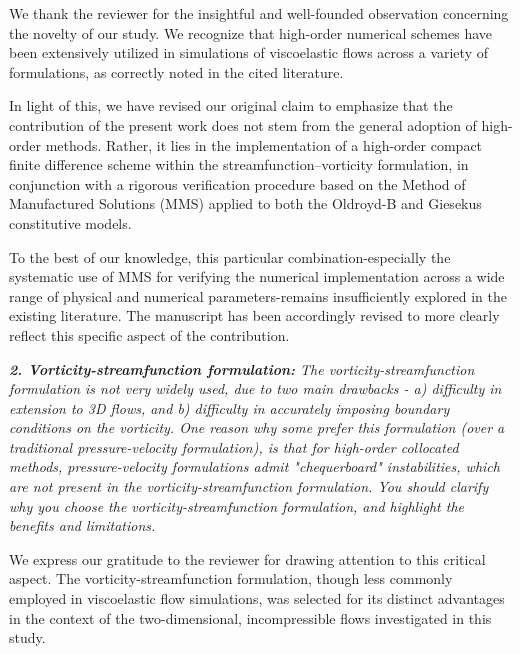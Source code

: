 \documentclass[12pt]{article}
\begin{document}
We thank the reviewer for the insightful and well-founded observation concerning the novelty of our study. We recognize that high-order numerical schemes have been extensively utilized in simulations of viscoelastic flows across a variety of formulations, as correctly noted in the cited literature.

In light of this, we have revised our original claim to emphasize that the contribution of the present work does not stem from the general adoption of high-order methods. Rather, it lies in the implementation of a high-order compact finite difference scheme within the streamfunction–vorticity formulation, in conjunction with a rigorous verification procedure based on the Method of Manufactured Solutions (MMS) applied to both the Oldroyd-B and Giesekus constitutive models.

To the best of our knowledge, this particular combination-especially the systematic use of MMS for verifying the numerical implementation across a wide range of physical and numerical parameters-remains insufficiently explored in the existing literature. The manuscript has been accordingly revised to more clearly reflect this specific aspect of the contribution.

\vspace{3mm}
{\it \textbf{2. Vorticity-streamfunction formulation:} The vorticity-streamfunction formulation is not very widely used, due to two main drawbacks - a) difficulty in extension to 3D flows, and b) difficulty in accurately imposing boundary conditions on the vorticity. One reason why some prefer this formulation (over a traditional pressure-velocity formulation), is that for high-order collocated methods, pressure-velocity formulations admit "chequerboard" instabilities, which are not present in the vorticity-streamfunction formulation. You should clarify why you choose the vorticity-streamfunction formulation, and highlight the benefits and limitations.}
\vspace{3mm}

We express our gratitude to the reviewer for drawing attention to this critical aspect. The vorticity-streamfunction formulation, though less commonly employed in viscoelastic flow simulations, was selected for its distinct advantages in the context of the two-dimensional, incompressible flows investigated in this study.
\end{document}

